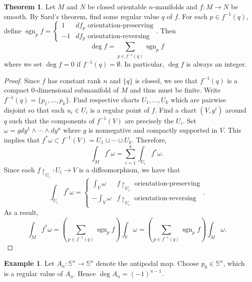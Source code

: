 \documentclass[10pt,letterpaper,cm]{nupset}
\theoremstyle{definition}
\newtheorem{exmp}[definition]{Example}
\theoremstyle{theorem}
\newtheorem{theorem}[definition]{Theorem}
\theoremstyle{remark}
\renewcommand{\S}{\mathbb S}
\newcommand{\1}{\mathbf{1}}
\newcommand{\0}{\vec 0}
\DeclareMathOperator{\sgn}{sgn}
\begin{document}
\begin{theorem}
Let $M$ and $N$ be closed orientable $n$-manifolds and $f: M \to N$ be smooth. By Sard's theorem, find some regular value $q$ of $f$. For each $p\in f^{-1}(q)$, define 
$ \sgn_pf = \begin{cases}
1 & df_p \text{ orientation-preserving} 
\\ -1  & df_p \text{ orientation-reversing} \end{cases}. $  Then $$\deg f = \sum_{p\in f^{-1}(q)} \sgn_pf$$ where we set $\deg f = 0$ if $f^{-1}(q) = \emptyset$.
In particular, $\deg f$ is always an integer. 
\end{theorem}
\begin{proof}
Since $f$ has constant rank $n$ and $\{q\}$ is closed, we see that $f^{-1}(q)$ is a compact $0$-dimensional submanifold  of $M$ and thus must be finite. Write $f^{-1}(q) = \{p_1, \ldots, p_k\}$. Find respective charts $U_1, \ldots, U_k$ which are pairwise disjoint so that each $u_i \in U_i$ is a regular point of $f$. Find a chart $(V, y^i)$ around $q$ such that the components of $f^{-1}(V)$ are precisely the $U_i$. Set $\omega = gdy^1 \wedge \cdots \wedge dy^n$ where $g$ is nonnegative and compactly supported in $V$. This implies that $f^{\ast}\omega \subset f^{-1}(V) =U_1 \sqcup \cdots \sqcup U_k$. Therefore, $$  \int_Mf^{\ast}\omega =\sum_{i=1}^k\int_{U_i}f^{\ast}\omega .$$ Since each $f\restriction_{U_i} : U_i \to V$ is a diffeomorphism, we have that $$ \int_{U_i}f^{\ast}\omega =
\begin{cases}
\int_{V} \omega & f\restriction_{U_i}  \text{ orientation-preserving} 
\\ -\int_V\omega  & f\restriction_{U_i} \text{ orientation-reversing}
\end{cases} .$$ As a result, $$\int_M f^{\ast} \omega  =\left(\sum_{p\in f^{-1}(q)} \sgn_pf \right)\int_V \omega =\left(\sum_{p\in f^{-1}(q)} \sgn_pf \right)\int_M \omega .$$
\end{proof}

\begin{exmp}
Let $A_n: \S^n \to \S^n$ denote the antipodal map. Choose $p_0 \in \S^n$, which is a regular value of $A_n$. Hence $\deg A_n = ({-}1)^{n-1}$.
\end{exmp}
\end{document}
